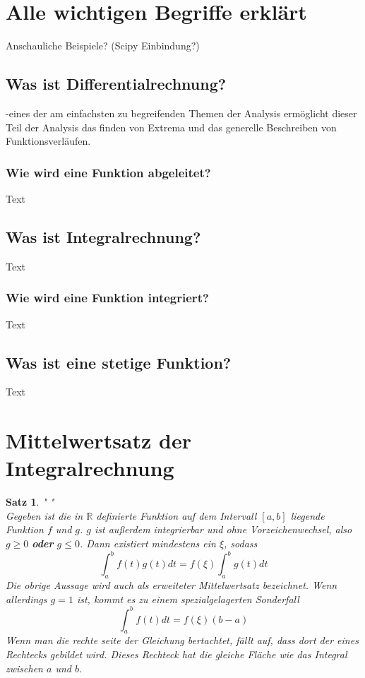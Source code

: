 \documentclass[fontsize=12pt,paper=a4,DIV12,cleardoublepage=empty, 
liststotoc,idxtotoc,bibtotoc]{article}
\newcommand{\RR}{\mathbb{R}}
\theoremstyle{plain}
\newtheorem{satz}{Satz}[subsection]
\theoremstyle{definition}
\begin{document}
	

	\section{Alle wichtigen Begriffe erklärt}
	Anschauliche Beispiele? (Scipy Einbindung?)
	
	
	\subsection{Was ist Differentialrechnung?}
	-eines der am einfachsten zu begreifenden Themen der Analysis ermöglicht dieser Teil der Analysis das finden von Extrema und das generelle Beschreiben von Funktionsverläufen.
	
	
	\subsubsection{Wie wird eine Funktion abgeleitet?}
		Text
	
	
	\subsection{Was ist Integralrechnung?}
		Text


	\subsubsection{Wie wird eine Funktion integriert?}
		Text
		
	
	\subsection{Was ist eine stetige Funktion?}
		Text	
	
	
	\section{Mittelwertsatz der Integralrechnung}
	\begin{satz}" "\\
		Gegeben ist die in $\RR$ definierte Funktion auf dem Intervall $[a, b]$ liegende Funktion $f$ und $g$. $g$ ist außerdem integrierbar und ohne Vorzeichenwechsel, also $g \geq 0$ \textbf{oder} $g \leq 0$. Dann existiert mindestens ein $\xi$, sodass
		\begin{equation*}
			\int_{a}^{b}f(t)g(t)dt=f(\xi)\int_{a}^{b}g(t)dt			
		\end{equation*}
		Die obrige Aussage wird auch als erweiteter Mittelwertsatz bezeichnet. Wenn allerdings $g=1$ ist, kommt es zu einem spezialgelagerten Sonderfall\\
		\begin{equation*}
			\int_{a}^{b}f(t)dt=f(\xi)(b-a)
		\end{equation*}
		Wenn man die rechte seite der Gleichung bertachtet, fällt auf, dass dort der eines Rechtecks gebildet wird. Dieses Rechteck hat die gleiche Fläche wie das Integral zwischen $a$ und $b$.		
		
	\end{satz}
	
\end{document}
